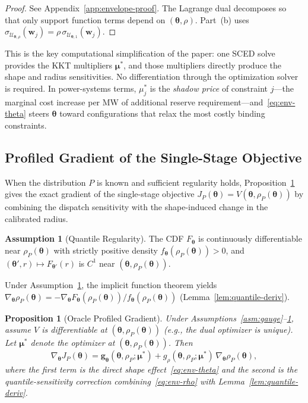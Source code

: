 \documentclass[11pt]{article}
\newcommand{\cU}{\mathcal{U}}
\newcommand{\btheta}{\bm{\theta}}
\newcommand{\bmu}{\bm{\mu}}
\newcommand{\bw}{\bm{w}}
\newcommand{\bg}{\bm{g}}
\newtheorem{proposition}[theorem]{Proposition}
\theoremstyle{definition}
\newtheorem{assumption}{Assumption}
\begin{document}
\begin{proof}
See Appendix~\ref{app:envelope-proof}. The Lagrange dual decomposes so that only support function terms depend on $(\btheta,\rho)$. Part~(b) uses $\sigma_{\cU_{\btheta,\rho}}(\bw_j)=\rho\,\sigma_{\cU_{\btheta,1}}(\bw_j)$.
\end{proof}

This is the key computational simplification of the paper: one SCED solve provides the KKT multipliers $\bmu^*$, and those multipliers directly produce the shape and radius sensitivities. No differentiation through the optimization solver is required. In power-systems terms, $\mu_j^*$ is the \emph{shadow price} of constraint $j$---the marginal cost increase per MW of additional reserve requirement---and~\eqref{eq:env-theta} steers $\btheta$ toward configurations that relax the most costly binding constraints.

\subsection{Profiled Gradient of the Single-Stage Objective}

When the distribution $P$ is known and sufficient regularity holds, Proposition~\ref{thm:true-oracle-grad} gives the exact gradient of the single-stage objective $J_P(\btheta) = V(\btheta, \rho_P(\btheta))$ by combining the dispatch sensitivity with the shape-induced change in the calibrated radius.

\begin{assumption}[Quantile Regularity]\label{asm:quantile-reg}
The CDF $F_{\btheta}$ is continuously differentiable near $\rho_P(\btheta)$ with strictly positive density $f_{\btheta}(\rho_P(\btheta)) > 0$, and $(\btheta',r) \mapsto F_{\btheta'}(r)$ is $C^1$ near $(\btheta, \rho_P(\btheta))$.
\end{assumption}

Under Assumption~\ref{asm:quantile-reg}, the implicit function theorem yields $\nabla_{\btheta} \rho_P(\btheta) = -\nabla_{\btheta} F_{\btheta}(\rho_P(\btheta)) / f_{\btheta}(\rho_P(\btheta))$ (Lemma~\ref{lem:quantile-deriv}).

\begin{proposition}[Oracle Profiled Gradient]\label{thm:true-oracle-grad}
Under Assumptions~\ref{asm:gauge}--\ref{asm:quantile-reg}, assume $V$ is differentiable at $(\btheta,\rho_P(\btheta))$ (e.g., the dual optimizer is unique). Let $\bmu^*$ denote the optimizer at $(\btheta,\rho_P(\btheta))$. Then
\begin{equation}\label{eq:true-grad-expanded}
\nabla_{\btheta}J_P(\btheta)=\bg_{\btheta}(\btheta,\rho_P;\bmu^*)+g_\rho(\btheta,\rho_P;\bmu^*)\,\nabla_{\btheta}\rho_P(\btheta),
\end{equation}
where the first term is the direct shape effect~\eqref{eq:env-theta} and the second is the quantile-sensitivity correction combining~\eqref{eq:env-rho} with Lemma~\ref{lem:quantile-deriv}.
\end{proposition}
\end{document}
